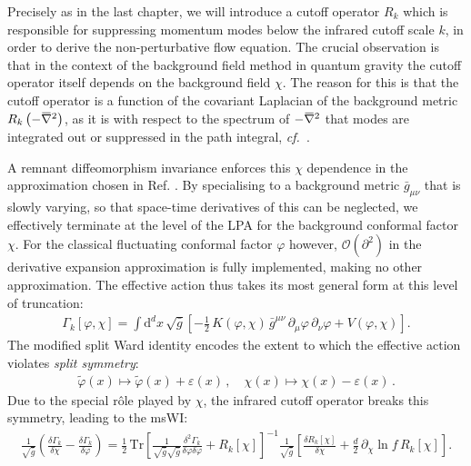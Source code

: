 \documentclass[11pt]{book} %
\newcommand{\overbar}[1]{\mkern 1.5mu\overline{\mkern-1.5mu#1\mkern-1.5mu}\mkern 1.5mu}
\newcommand{\bnabla}{\overbar \nabla}
\newcommand\cf{\textit{cf.}\ }
\newcommand{\eps}{\varepsilon}
\newcommand{\vp}{\varphi}
\newcommand{\dclnf}{\,\partial_\chi\! \ln\! f \,}
\numberwithin{equation}{chapter}
\begin{document}
Precisely as in the last chapter, we will introduce a cutoff operator $R_k$
which is responsible for suppressing momentum modes below the infrared cutoff scale $k$,
in order to derive the non-perturbative flow equation.
The crucial observation is that in the context of the background field method in quantum gravity the
cutoff operator itself depends on the background field $\chi$.
The reason for this is that the cutoff operator is a function of the covariant Laplacian of the
background metric $R_k\left(-\bnabla^2\right)$, as it is with respect to the spectrum of
$-\bnabla^2$ that modes are integrated out or suppressed in the path integral,
\cf \cite{Reuter:2008wj,Reuter:2009kq}.

A remnant diffeomorphism invariance enforces this $\chi$ dependence in the approximation chosen in
Ref. \cite{Dietz:2015owa}.
By specialising to a background metric ${\bar g}_{\mu\nu}$ that is slowly varying,
so that space-time derivatives of this can be neglected, we effectively terminate at the level of
the LPA for the background conformal factor $\chi$.
For the classical fluctuating conformal factor $\vp$ however,
$\mathcal{O}(\partial^2)$ in the derivative expansion approximation is fully implemented,
making no other approximation.
The effective action thus takes its most general form at this level of truncation:
\begin{align}
  \Gamma_k[\varphi, \chi] = \int \mathrm d^dx \, \sqrt{\bar g}
  \left[
    - \frac{1}{2} \, K(\varphi,\chi) \, \bar g^{\mu\nu} \, \partial_{\mu}\varphi \, \partial_{\nu}\varphi
    + V(\varphi,\chi)
  \right] .
  \label{trunc}
\end{align}
The modified split Ward identity encodes the extent to which the effective action violates
\textit{split symmetry}:
\begin{align}
  \tilde \vp(x) \mapsto \tilde \vp(x) + \eps(x) \,, \quad \chi(x) \mapsto \chi(x) -\eps(x)\,.
  \label{equ:split-symmetry}
\end{align}
Due to the special r\^ole played by $\chi$, the infrared cutoff operator breaks this symmetry,
leading to the msWI:
\begin{align}
  \frac{1}{\sqrt{\bar g}}
  \left(
    \frac{\delta\Gamma_k}{\delta \chi} - \frac{\delta \Gamma_k}{\delta \vp}
  \right)
  = \frac{1}{2} \, \mathrm{Tr}
  \left[
    \frac{1}{\sqrt{\bar g}\sqrt{\bar g}}\frac{\delta^2\Gamma_k}
    {\delta \vp \delta \vp}+ R_k[\chi]
  \right]^{-1}
  \frac{1}{\sqrt{\bar g}}
  \left[
    \frac{\delta R_k[\chi] }{\delta \chi}+\frac{d}{2}\dclnf R_k[\chi]
  \right] .
  \label{equ:sWiGamma}
\end{align}
\end{document}
